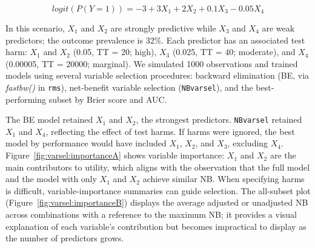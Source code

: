  \begin{equation}
 	logit(P(Y=1)) = -3 + 3X_1 + 2X_2 + 0.1X_3 - 0.05X_4
 \end{equation}

 In this scenario, $X_1$ and $X_2$ are strongly predictive while $X_3$ and $X_4$ are weak predictors; the outcome prevalence is 32\%. Each predictor has an associated test harm: $X_1$ and $X_2$ (0.05, TT = 20; high), $X_3$ (0.025, TT = 40; moderate), and $X_4$ (0.00005, TT = 20000; marginal). We simulated 1000 observations and trained models using several variable selection procedures: backward elimination (BE, via \textit{fastbw()} in \texttt{rms}), net-benefit variable selection (\texttt{NBvarsel}), and the best-performing subset by Brier score and AUC.

 The BE model retained $X_1$ and $X_2$, the strongest predictors. \texttt{NBvarsel} retained $X_1$ and $X_4$, reflecting the effect of test harms. If harms were ignored, the best model by performance would have included $X_1$, $X_2$, and $X_3$, excluding $X_4$. Figure~\ref{fig:varsel:importanceA} shows variable importance: $X_1$ and $X_2$ are the main contributors to utility, which aligns with the observation that the full model and the model with only $X_1$ and $X_2$ achieve similar \gls{NB}. When specifying harms is difficult, variable-importance summaries can guide selection. The all-subset plot (Figure~\ref{fig:varsel:importanceB}) displays the average adjusted or unadjusted \gls{NB} across combinations with a reference to the maximum \gls{NB}; it provides a visual explanation of each variable's contribution but becomes impractical to display as the number of predictors grows.

